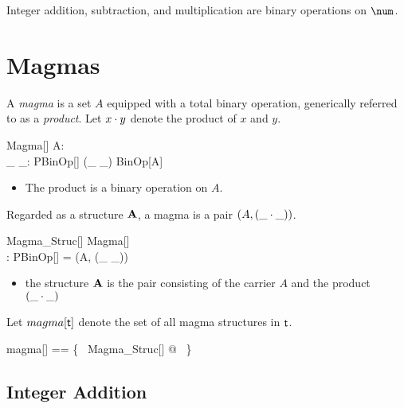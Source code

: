 \documentclass{amsart}
\begin{document}
\begin{example} Integer addition, subtraction, and multiplication are binary operations on $\num$.


\end{example}

\section{Magmas}

A \textit{magma} is a set $A$ equipped with a total binary operation, 
generically referred to as a \textit{product}.
Let $x \mathbin{\cdot} y$ denote the product of $x$ and $y$.

\begin{schema}{Magma}[\genT]
	A: \power \genT \\
	\_ \opG \_: PBinOp[\genT]
\where
	(\_ \opG \_) \in BinOp[A]
\end{schema}

\begin{itemize}
	\item The product is a binary operation on $A$.
\end{itemize}

Regarded as a structure $\mathbf{A}$, a magma is a pair $(A, (\_ \mathbin{\cdot} \_))$.

\begin{schema}{Magma\_Struc}[\genT]
	Magma[\genT] \\
	\strucA: \power \genT \cross PBinOp[\genT]
\where
	\strucA = (A, (\_ \opG \_))
\end{schema}

\begin{itemize}
	\item the structure $\mathbf{A}$ is the pair consisting of the carrier $A$ and the product $(\_ \mathbin{\cdot} \_)$
\end{itemize}


Let $magma[\mathsf{t}]$ denote the set of all magma structures in $\mathsf{t}$.
\begin{zed}
	magma[\genT] == \{~ Magma\_Struc[\genT] @ \strucA ~\}
\end{zed}

\subsection{Integer Addition}
\end{document}
